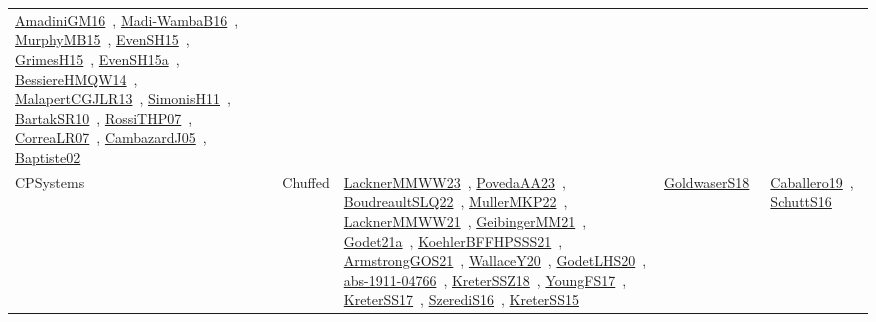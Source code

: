 {\begin{longtable}{lp{3cm}>{\raggedright\arraybackslash}p{6cm}>{\raggedright\arraybackslash}p{6cm}>{\raggedright\arraybackslash}p{8cm}}
\href{../works/AmadiniGM16.pdf}{AmadiniGM16}~\cite{AmadiniGM16}, \href{../works/Madi-WambaB16.pdf}{Madi-WambaB16}~\cite{Madi-WambaB16}, \href{../works/MurphyMB15.pdf}{MurphyMB15}~\cite{MurphyMB15}, \href{../works/EvenSH15.pdf}{EvenSH15}~\cite{EvenSH15}, \href{../works/GrimesH15.pdf}{GrimesH15}~\cite{GrimesH15}, \href{../works/EvenSH15a.pdf}{EvenSH15a}~\cite{EvenSH15a}, \href{../works/BessiereHMQW14.pdf}{BessiereHMQW14}~\cite{BessiereHMQW14}, \href{../works/MalapertCGJLR13.pdf}{MalapertCGJLR13}~\cite{MalapertCGJLR13}, \href{../works/SimonisH11.pdf}{SimonisH11}~\cite{SimonisH11}, \href{../works/BartakSR10.pdf}{BartakSR10}~\cite{BartakSR10}, \href{../works/RossiTHP07.pdf}{RossiTHP07}~\cite{RossiTHP07}, \href{../works/CorreaLR07.pdf}{CorreaLR07}~\cite{CorreaLR07}, \href{../works/CambazardJ05.pdf}{CambazardJ05}~\cite{CambazardJ05}, \href{../works/Baptiste02.pdf}{Baptiste02}~\cite{Baptiste02}\\
CPSystems & Chuffed & \href{../works/LacknerMMWW23.pdf}{LacknerMMWW23}~\cite{LacknerMMWW23}, \href{../works/PovedaAA23.pdf}{PovedaAA23}~\cite{PovedaAA23}, \href{../works/BoudreaultSLQ22.pdf}{BoudreaultSLQ22}~\cite{BoudreaultSLQ22}, \href{../works/MullerMKP22.pdf}{MullerMKP22}~\cite{MullerMKP22}, \href{../works/LacknerMMWW21.pdf}{LacknerMMWW21}~\cite{LacknerMMWW21}, \href{../works/GeibingerMM21.pdf}{GeibingerMM21}~\cite{GeibingerMM21}, \href{../works/Godet21a.pdf}{Godet21a}~\cite{Godet21a}, \href{../works/KoehlerBFFHPSSS21.pdf}{KoehlerBFFHPSSS21}~\cite{KoehlerBFFHPSSS21}, \href{../works/ArmstrongGOS21.pdf}{ArmstrongGOS21}~\cite{ArmstrongGOS21}, \href{../works/WallaceY20.pdf}{WallaceY20}~\cite{WallaceY20}, \href{../works/GodetLHS20.pdf}{GodetLHS20}~\cite{GodetLHS20}, \href{../works/abs-1911-04766.pdf}{abs-1911-04766}~\cite{abs-1911-04766}, \href{../works/KreterSSZ18.pdf}{KreterSSZ18}~\cite{KreterSSZ18}, \href{../works/YoungFS17.pdf}{YoungFS17}~\cite{YoungFS17}, \href{../works/KreterSS17.pdf}{KreterSS17}~\cite{KreterSS17}, \href{../works/SzerediS16.pdf}{SzerediS16}~\cite{SzerediS16}, \href{../works/KreterSS15.pdf}{KreterSS15}~\cite{KreterSS15} & \href{../works/GoldwaserS18.pdf}{GoldwaserS18}~\cite{GoldwaserS18} & \href{../works/Caballero19.pdf}{Caballero19}~\cite{Caballero19}, \href{../works/SchuttS16.pdf}{SchuttS16}~\cite{SchuttS16}\\

\end{longtable}}
